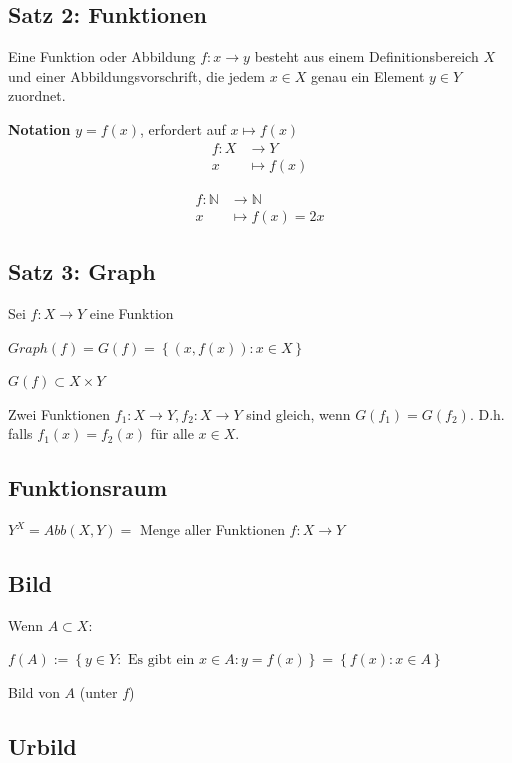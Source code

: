 \documentclass[fleqn]{scrbook}
\newenvironment{example}{{\bfseries Beispiel }}{}
\begin{document}
\subsection{Satz 2: Funktionen}

Eine Funktion oder Abbildung $f : x \to y$ besteht aus einem Definitionsbereich $X$ und einer Abbildungsvorschrift, die jedem $x \in X$ genau ein Element $y \in Y$ zuordnet.

\textbf{Notation} $y=f(x)$, erfordert auf $x \mapsto f(x)$
\begin{align*}
  f : X &\to Y\\
  x &\mapsto f(x)
\end{align*}

\begin{example}
\begin{align*}
  f : \mathbb{N} &\to \mathbb{N}\\
  x &\mapsto f(x) = 2x
\end{align*}
\end{example}

\subsection{Satz 3: Graph}

Sei $f:X \to Y$ eine Funktion

$Graph(f) = G(f) = \left\{ (x,f(x)) : x \in X \right\}$

$G(f) \subset X \times Y$

Zwei Funktionen $f_1 : X \to Y, f_2 : X \to Y$ sind gleich, wenn $G(f_1) = G(f_2)$. D.h. falls $f_1(x)=f_2(x)$ für alle $x \in X$.

\subsection{Funktionsraum}

$Y^X = Abb(X,Y) = $ Menge aller Funktionen $f : X \to Y$

\subsection{Bild}

Wenn $A \subset X$:

$f(A):=\left\{ y \in Y : \text{ Es gibt ein } x \in A : y=f(x) 
\right\} =\left\{ f(x) : x \in A \right\}$

Bild von $A$ (unter $f$)

\subsection{Urbild}
\end{document}
